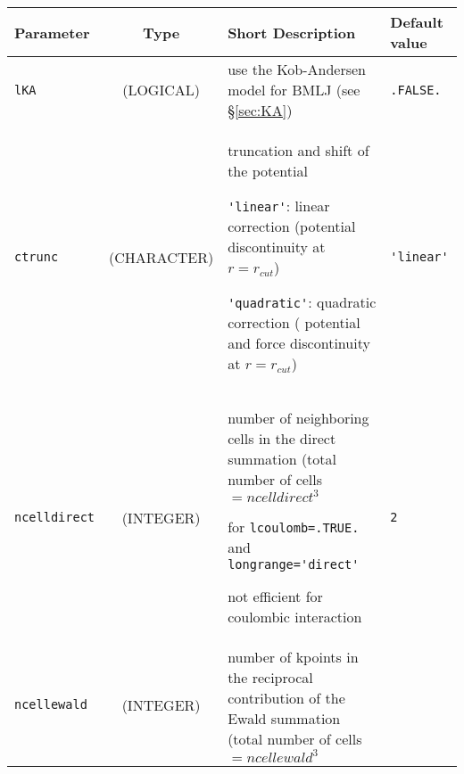\documentclass[a4paper]{article}
\begin{document}
\begin{longtable}{l|c|m{8cm}|m{2cm}}
\hline
\hline
Parameter          &  Type              &          Short Description                                                          & Default value \\
\hline
\hline
\rule[-0.75cm]{0cm}{1.5cm}
\verb?lKA?         &  (LOGICAL)         & use the Kob-Andersen model for BMLJ (see \S \ref{sec:KA})                           & \verb?.FALSE.? \\
\hline
\rule[-0.75cm]{0cm}{1.5cm}
\verb?ctrunc?      &  (CHARACTER)       & \newline truncation and shift of the potential \newline 

                                         \verb?'linear'?: linear correction (potential discontinuity at $r=r_{cut}$) \newline 
					 
                   			 \verb?'quadratic'?: quadratic correction ( potential and force 
					 discontinuity at $r=r_{cut}$) \newline                                               & \verb?'linear'? \tabularnewline
\hline
\rule[-0.75cm]{0cm}{1.5cm}
\verb?ncelldirect? &  (INTEGER)         & \newline number of neighboring cells in the direct summation 
                                         (total number of cells $=ncelldirect^3$ \newline 

                                          for \verb?lcoulomb=.TRUE.? and \verb?longrange='direct'?  \newline                  
					  
					  not efficient for coulombic interaction                                             & \verb?2? \\
\hline
\rule[-0.75cm]{0cm}{1.5cm}
\verb?ncellewald?  &  (INTEGER)         & \newline number of kpoints in the reciprocal contribution of the Ewald summation
                                         (total number of cells $=ncellewald^3$ \newline                                      
					 

\end{longtable}
\end{document}

